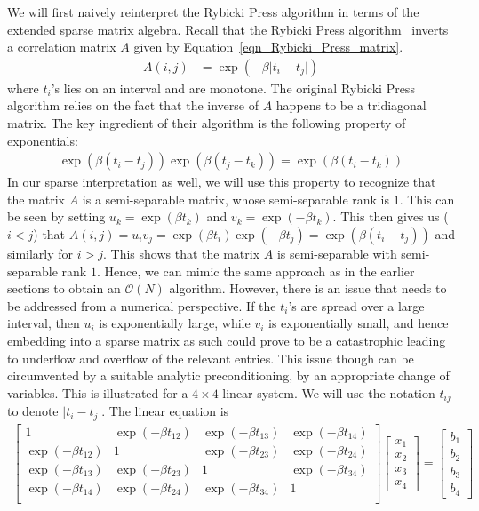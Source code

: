 \documentclass[times]{nlaauth}
\begin{document}
We will first naively reinterpret the Rybicki Press algorithm in terms of the extended sparse matrix algebra. Recall that the Rybicki Press algorithm~\cite{rybicki1995class} inverts a correlation matrix $A$ given by Equation~\eqref{eqn_Rybicki_Press_matrix}.
\begin{align}
A(i,j) & = \exp\left(-\beta \lvert t_i - t_j \rvert\right)
\label{eqn_Rybicki_Press_matrix}
\end{align}
where $t_i$'s lies on an interval and are monotone. The original Rybicki Press algorithm relies on the fact that the inverse of $A$ happens to be a tridiagonal matrix. The key ingredient of their algorithm is the following property of exponentials:
\begin{align}
\exp\left(\beta (t_i-t_j) \right)\exp\left(\beta (t_j-t_k) \right) = \exp\left(\beta (t_i-t_k)\right)
\end{align}
In our sparse interpretation as well, we will use this property to recognize that the matrix $A$ is a semi-separable matrix, whose semi-separable rank is $1$. This can be seen by setting $u_k = \exp(\beta t_k)$ and $v_k = \exp(-\beta t_k)$. This then gives us ($i<j$) that $A(i,j) = u_i v_j = \exp(\beta t_i) \exp(-\beta t_j) = \exp(\beta(t_i-t_j))$ and similarly for $i>j$. This shows that the matrix $A$ is semi-separable with semi-separable rank $1$. Hence, we can mimic the same approach as in the earlier sections to obtain an $\mathcal{O}(N)$ algorithm. However, there is an issue that needs to be addressed from a numerical perspective. If the $t_i$'s are spread over a large interval, then $u_i$ is exponentially large, while $v_i$ is exponentially small, and hence embedding into a sparse matrix as such could prove to be a catastrophic leading to underflow and overflow of the relevant entries. This issue though can be circumvented by a suitable analytic preconditioning, by an appropriate change of variables. This is illustrated for a $4 \times 4$ linear system. We will use the notation $t_{ij}$ to denote $\lvert t_i - t_j\lvert$. The linear equation is
\begin{align}
\begin{bmatrix}
1 & \exp(-\beta t_{12}) & \exp(-\beta t_{13}) & \exp(-\beta t_{14})\\
\exp(-\beta t_{12}) & 1 & \exp(-\beta t_{23}) & \exp(-\beta t_{24})\\
\exp(-\beta t_{13}) & \exp(-\beta t_{23}) & 1 & \exp(-\beta t_{34})\\
\exp(-\beta t_{14}) & \exp(-\beta t_{24}) & \exp(-\beta t_{34}) & 1\\
\end{bmatrix}
\begin{bmatrix}
x_1\\x_2\\x_3\\x_4
\end{bmatrix}
=
\begin{bmatrix}
b_1\\b_2\\b_3\\b_4
\end{bmatrix}
\end{align}
\end{document}
